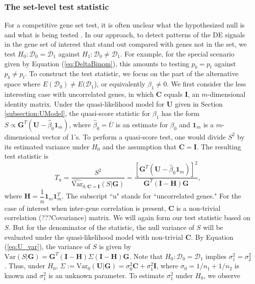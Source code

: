 \documentclass[a4,center,fleqn]{NAR}
\begin{document}
	\subsubsection{The set-level test statistic}\label{subsection:MEQL}
	For a competitive gene set test, it is often unclear what the hypothesized null is and what is
	being tested \citep{barry2008statistical,wu2012camera}. In our approach, to detect patterns of the
	DE signals in the gene set of interest that stand out compared with genes not in the set, we test
	$H_0: \mathscr{D}_0=\mathscr{D}_1$ against $H_1: \mathscr{D}_0\ne\mathscr{D}_1$. For example, for
	the special scenario given by Equation (\ref{eq:DeltaBinom}), this amounts to testing $p_{b}=p_{t}$
	against $p_{b}\ne p_{t}$.
	To construct the test statistic, we focus on the part of the alternative space where
	$E(\mathscr{D}_0)\ne E(\mathscr{D}_1$), or equivalently $\beta_1\ne 0$. We first consider the less
	interesting case with uncorrelated genes, in which $\bm C$ equals $\bm I$, an $m$-dimensional
	identity matrix. Under the quasi-likelihood model for $\bm U$ given in Section
	\ref{subsection:UModel},  the quasi-score statistic for $\beta_1$ has the form $S \propto \bm
	G^T(\bm U-\hat\beta_0\bm 1_m)$, where $\hat\beta_0=\overline{U}$ is an estimate for $\beta_0$ and
	$\bm 1_m$ is a $m$-dimensional vector of 1's. To perform a quasi-score test, one would divide $S^2$
	by its estimated variance under $H_0$ and the assumption that $\bm C=\bm I$. The resulting test
	statistic is 
	\begin{equation}
	T_{\text{u}} = \dfrac{S^2}{\widehat{\mbox{Var}}_{0, \bm C=\bm I}(S|\bm G)} = \dfrac{[\bm G^T(\bm
		U-\hat\beta_0\bm 1_m)]^2}{\bm G^T(\bm I-\bm H)\bm G}, 
	\end{equation}
	where $\bm H = \dfrac{1}{n}\bm 1_m\bm 1_m^T$. The subscript ``u" stands for ``uncorrelated genes."
	For the case of interest when inter-gene correlation is present, $\bm C$ is a non-trivial
	correlation (???Covariance) matrix. We will again form our test statistic based on $S$. But for the
	denominator of the statistic, the null variance of $S$ will be evaluated under the quasi-likelihood
	model with non-trivial $\bm C$. By Equation (\ref{eq:U_var}), the variance of $S$ is given by
	$\mbox{Var}(S|\bm G) = \bm G^T(\bm I-\bm H)\Sigma(\bm I-\bm H)\bm G$. Note that $H_0:
	\mathscr{D}_0=\mathscr{D}_1$ implies $\sigma_1^2=\sigma_2^2$. Thus, under $H_0$,
	$\Sigma:=\mbox{Var}_{0}(\bm U|\bm G)=\sigma_0^2\bm C+\sigma_1^2\bm I$, where $\sigma_0=1/n_1+1/n_2$
	is known and $\sigma_1^2$ is an unknown parameter. To estimate $\sigma_1^2$ under $H_0$, we observe
\end{document}
